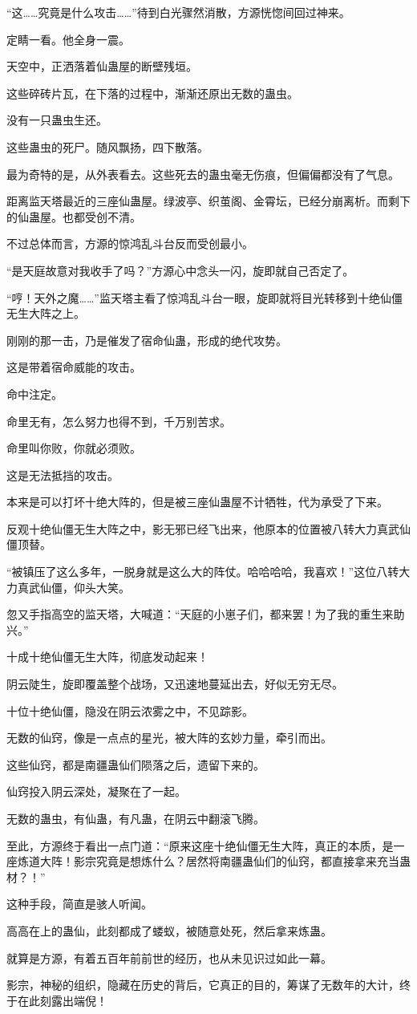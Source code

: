 \begin{this_body}
“这……究竟是什么攻击……”待到白光骤然消散，方源恍惚间回过神来。

定睛一看。他全身一震。

天空中，正洒落着仙蛊屋的断壁残垣。

这些碎砖片瓦，在下落的过程中，渐渐还原出无数的蛊虫。

没有一只蛊虫生还。

这些蛊虫的死尸。随风飘扬，四下散落。

最为奇特的是，从外表看去。这些死去的蛊虫毫无伤痕，但偏偏都没有了气息。

距离监天塔最近的三座仙蛊屋。绿波亭、织茧阁、金霄坛，已经分崩离析。而剩下的仙蛊屋。也都受创不清。

不过总体而言，方源的惊鸿乱斗台反而受创最小。

“是天庭故意对我收手了吗？”方源心中念头一闪，旋即就自己否定了。

“哼！天外之魔……”监天塔主看了惊鸿乱斗台一眼，旋即就将目光转移到十绝仙僵无生大阵之上。

刚刚的那一击，乃是催发了宿命仙蛊，形成的绝代攻势。

这是带着宿命威能的攻击。

命中注定。

命里无有，怎么努力也得不到，千万别苦求。

命里叫你败，你就必须败。

这是无法抵挡的攻击。

本来是可以打坏十绝大阵的，但是被三座仙蛊屋不计牺牲，代为承受了下来。

反观十绝仙僵无生大阵之中，影无邪已经飞出来，他原本的位置被八转大力真武仙僵顶替。

“被镇压了这么多年，一脱身就是这么大的阵仗。哈哈哈哈，我喜欢！”这位八转大力真武仙僵，仰头大笑。

忽又手指高空的监天塔，大喊道：“天庭的小崽子们，都来罢！为了我的重生来助兴。”

十成十绝仙僵无生大阵，彻底发动起来！

阴云陡生，旋即覆盖整个战场，又迅速地蔓延出去，好似无穷无尽。

十位十绝仙僵，隐没在阴云浓雾之中，不见踪影。

无数的仙窍，像是一点点的星光，被大阵的玄妙力量，牵引而出。

这些仙窍，都是南疆蛊仙们陨落之后，遗留下来的。

仙窍投入阴云深处，凝聚在了一起。

无数的蛊虫，有仙蛊，有凡蛊，在阴云中翻滚飞腾。

至此，方源终于看出一点门道：“原来这座十绝仙僵无生大阵，真正的本质，是一座炼道大阵！影宗究竟是想炼什么？居然将南疆蛊仙们的仙窍，都直接拿来充当蛊材？！”

这种手段，简直是骇人听闻。

高高在上的蛊仙，此刻都成了蝼蚁，被随意处死，然后拿来炼蛊。

就算是方源，有着五百年前前世的经历，也从未见识过如此一幕。

影宗，神秘的组织，隐藏在历史的背后，它真正的目的，筹谋了无数年的大计，终于在此刻露出端倪！

\end{this_body}

